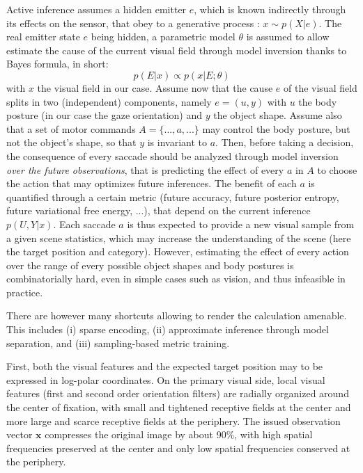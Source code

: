 Active inference assumes a hidden emitter $e$, which is known indirectly through its effects on the sensor, that obey to a generative process : $x\sim p(X|e)$. The real emitter state $e$ being hidden, a parametric model $\theta$ is assumed to allow estimate the cause of the current visual field through model inversion thanks to Bayes formula, in short:
$$p(E|x) \propto p(x|E;\theta)$$
with $x$ the visual field in our case. Assume now that the cause $e$ of the visual field splits in two (independent) components, namely $e = (u,y)$ with $u$ the body posture (in our case the gaze orientation) and $y$ the object shape. Assume also that a set of motor commands $A = \{..., a, ...\}$ may control the body posture, but not the object's shape, so that $y$ is invariant to $a$.
Then, before taking a decision, the consequence of every saccade should be analyzed  through model inversion \emph{over the future observations}, that is predicting the effect of every $a$ in $A$ to choose the action that may optimizes future inferences. The benefit of each $a$ is quantified through a certain metric (future accuracy, future posterior entropy, future variational free energy, ...), that depend on the current inference $p(U,Y|x)$. Each saccade $a$ is thus expected to provide a new visual sample from a given scene statistics, which may increase the understanding of the scene (here the target position and category). However, estimating the effect of every action over the range of every possible object shapes and body postures is combinatorially hard, even in simple cases such as vision, and thus infeasible in practice. 



There are however many shortcuts allowing to render the calculation amenable. This includes (i) sparse encoding, (ii) approximate inference through model separation, and (iii) sampling-based metric training. 

First, both the visual features and the expected target position may to be expressed in log-polar coordinates. On the primary visual side, local visual features (first and second order orientation filters) are radially organized around the center of fixation, with small and tightened receptive fields at the center and more large and scarce receptive fields at the periphery. The issued observation vector $\boldsymbol{x}$ compresses the original image by about 90\%, with high spatial frequencies preserved at the center and only low spatial frequencies conserved at the periphery.

